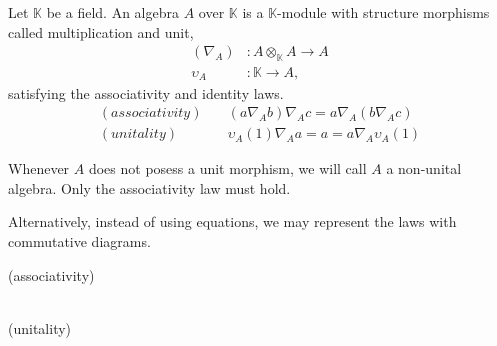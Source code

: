 \documentclass[../thesis.tex]{subfiles}
\begin{document}
            \begin{definition}[Algebra]
                Let $\mathbb{K}$ be a field. An algebra $A$ over $\mathbb{K}$ is a $\mathbb{K}$-module with structure morphisms called multiplication and unit,
                \begin{align*}
                    (\nabla_A) & : A\otimes_{\mathbb{K}}A \rightarrow A \\
                    \upsilon_A & : \mathbb{K} \rightarrow A,
                \end{align*}
                satisfying the associativity and identity laws. 
                \begin{align*}
                    (associativity)\quad & (a \nabla_A b) \nabla_A c = a \nabla_A (b \nabla_A c) \\
                    (unitality)\quad & \upsilon_A(1) \nabla_A a = a = a \nabla_A \upsilon_A(1)
                \end{align*}
            \end{definition}
            \begin{remark}
                Whenever $A$ does not posess a unit morphism, we will call $A$ a non-unital algebra. Only the associativity law must hold.
            \end{remark}
            Alternatively, instead of using equations, we may represent the laws with commutative diagrams. 
            \begin{center}
                (associativity)\quad
                 \\
                (unitality) \quad
            \end{center}
\end{document}
